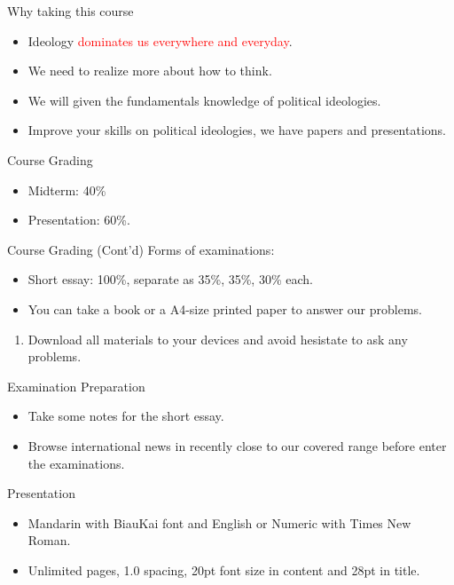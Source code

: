 \documentclass{beamer}
\begin{document}
\begin{frame}{Why taking this course}
\begin{itemize}
\item Ideology \textcolor{red}{dominates us everywhere and everyday}.
\item We need to realize more about how to think.
\item We will given the fundamentals knowledge of political ideologies.
\item Improve your skills on political ideologies, we have papers and presentations.
\end{itemize}
\end{frame}
\begin{frame}{Course Grading}
\begin{itemize}
\item Midterm: 40\%
\item Presentation: 60\%.
\end{itemize}
\end{frame}
\begin{frame}{Course Grading (Cont'd)}
Forms of examinations:
\begin{itemize}
\item Short essay: 100\%, separate as 35\%, 35\%, 30\% each.
\item You can take a book or a A4-size printed paper to answer our problems.
\end{itemize}
\begin{enumerate}
\item Download all materials to your devices and avoid hesistate to ask any problems.
\end{enumerate}
\end{frame}
\begin{frame}{Examination Preparation}
\begin{itemize}
\item Take some notes for the short essay.
\item Browse international news in recently close to our covered range before enter the examinations.
\end{itemize}
\end{frame}
\begin{frame}{Presentation}
\begin{itemize}
\item Mandarin with BiauKai font and English or Numeric with Times New Roman.
\item Unlimited pages, 1.0 spacing, 20pt font size in content and 28pt in title.
\end{itemize}
\end{frame}
\end{document}
